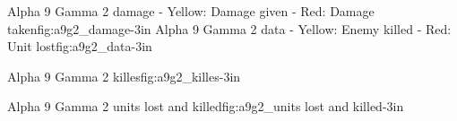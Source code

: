 
			{Alpha 9 Gamma 2 damage - Yellow: Damage given - Red: Damage taken}{fig:a9g2_damage}{-3in}		
			\newpage			
{}
			{Alpha 9 Gamma 2 data - Yellow: Enemy killed - Red: Unit lost}{fig:a9g2_data}{-3in}		
			\newpage

			{Alpha 9 Gamma 2 killes}{fig:a9g2_killes}{-3in}
			\newpage

			{Alpha 9 Gamma 2 units lost and killed}{fig:a9g2_units lost and killed}{-3in}

			\newpage